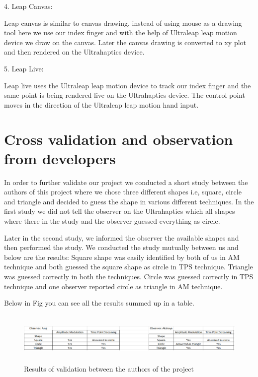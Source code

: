 4. Leap Canvas:

Leap canvas is similar to canvas drawing, instead of using mouse as a drawing tool here we use our index finger and with the help of Ultraleap leap motion device we draw on the canvas. Later the canvas drawing is converted to xy plot and then rendered on the Ultrahaptics device.

5. Leap Live:

Leap live uses the Ultraleap leap motion device to track our index finger and the same point is being rendered live on the Ultrahaptics device. The control point moves in the direction of the Ultraleap leap motion hand input.

\section{Cross validation and observation from developers}
\label{sec:validation:cross validation and observation from developers}

In order to further validate our project we conducted a short study between the authors of this project where we chose three different shapes i.e, square, circle and triangle and decided to guess the shape in various different techniques. In the first study we did not tell the observer on the Ultrahaptics which all shapes where there in the study and the observer guessed everything as circle. 

Later in the second study, we informed the observer the available shapes and then performed the study. We conducted the study mutually between us and below are the results:
Square shape was easily identified by both of us in AM technique and both guessed the square shape as circle in TPS technique. Triangle was guessed correctly in both the techniques. Circle was guessed correctly in TPS technique and one observer reported circle as triangle in AM technique. 

Below in Fig you can see all the results summed up in a table. 

\begin{figure}[htb]
	\includegraphics[width=150mm, height=25mm]{gfx/user_study_result.png}
	\caption{Results of validation between the authors of the project}
	\label{fig:validation:svg_sq_tps}
\end{figure}


